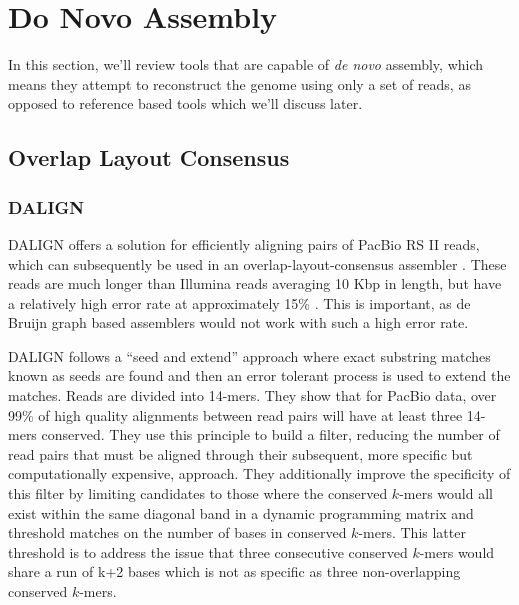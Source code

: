 \section{Do Novo Assembly}

In this section, we'll review tools that are capable of \emph{de novo} assembly, which means they attempt to reconstruct the genome using only a set of reads, as opposed to reference based tools which we'll discuss later.

\subsection{Overlap Layout Consensus}

\subsubsection{DALIGN}

DALIGN offers a solution for efficiently aligning pairs of PacBio RS II reads, which can subsequently be used in an overlap-layout-consensus assembler \cite{myers2014efficient}.
These reads are much longer than Illumina reads averaging 10 Kbp in length, but have a relatively high error rate at approximately 15\%  \cite{quail2012tale,myers2014efficient}.  
This is important, as de Bruijn graph based assemblers would not work with such a high error rate.

DALIGN follows a ``seed and extend'' approach where exact substring matches known as seeds are found and then an error tolerant process is used to extend the matches.
Reads are divided into 14-mers.
They show that for PacBio data, over 99\% of high quality alignments between read pairs will have at least three 14-mers conserved.
They use this principle to build a filter, reducing the number of read pairs that must be aligned through their subsequent, more specific but computationally expensive, approach.
They additionally improve the specificity of this filter by limiting candidates to those where the conserved $k$-mers would all exist within the same diagonal band in a dynamic programming matrix and threshold matches on the number of bases in conserved $k$-mers. %
This latter threshold is to address the issue that three consecutive conserved $k$-mers would share a run of k+2 bases which is not as specific as three non-overlapping conserved $k$-mers.

